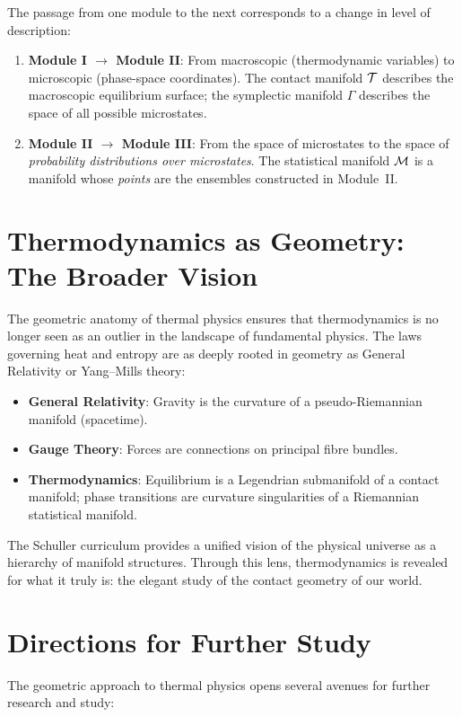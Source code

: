 The passage from one module to the next corresponds to a change in level of description:
\begin{enumerate}
\item \textbf{Module I $\to$ Module II}: From macroscopic (thermodynamic variables) to microscopic (phase-space coordinates). The contact manifold $\mathcal{T}$ describes the macroscopic equilibrium surface; the symplectic manifold $\Gamma$ describes the space of all possible microstates.
\item \textbf{Module II $\to$ Module III}: From the space of microstates to the space of \emph{probability distributions over microstates}. The statistical manifold $\mathcal{M}$ is a manifold whose \emph{points} are the ensembles constructed in Module~II.
\end{enumerate}

\section{Thermodynamics as Geometry: The Broader Vision}

The geometric anatomy of thermal physics ensures that thermodynamics is no longer seen as an outlier in the landscape of fundamental physics. The laws governing heat and entropy are as deeply rooted in geometry as General Relativity or Yang--Mills theory:

\begin{itemize}
\item \textbf{General Relativity}: Gravity is the curvature of a pseudo-Riemannian manifold (spacetime).
\item \textbf{Gauge Theory}: Forces are connections on principal fibre bundles.
\item \textbf{Thermodynamics}: Equilibrium is a Legendrian submanifold of a contact manifold; phase transitions are curvature singularities of a Riemannian statistical manifold.
\end{itemize}

The Schuller curriculum provides a unified vision of the physical universe as a hierarchy of manifold structures. Through this lens, thermodynamics is revealed for what it truly is: the elegant study of the contact geometry of our world.

\section{Directions for Further Study}

The geometric approach to thermal physics opens several avenues for further research and study:

